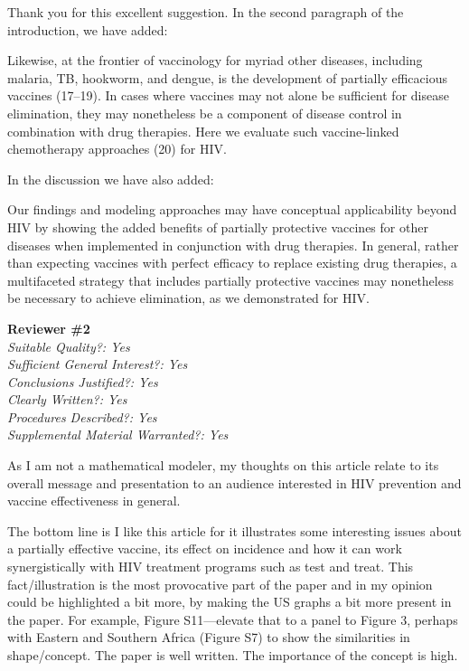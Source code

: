 \documentclass[12pt]{jpmletter}
\newcommand{\section}[1]{\textbf{#1}\\}
\newenvironment{original}{\it}{}
\begin{document}
\begin{letter}{}
    Thank you for this excellent suggestion. In the second paragraph
    of the introduction, we have added:
    \begin{quoting}
      Likewise, at the frontier of vaccinology for myriad other
      diseases, including malaria, TB, hookworm, and dengue, is the
      development of partially efficacious vaccines (17--19). In cases
      where vaccines may not alone be sufficient for disease
      elimination, they may nonetheless be a component of disease
      control in combination with drug therapies. Here we evaluate
      such vaccine-linked chemotherapy approaches (20) for HIV.
    \end{quoting}

    In the discussion we have also added:
    \begin{quoting}
      Our findings and modeling approaches may have conceptual
      applicability beyond HIV by showing the added benefits of
      partially protective vaccines for other diseases when
      implemented in conjunction with drug therapies. In general,
      rather than expecting vaccines with perfect efficacy to replace
      existing drug therapies, a multifaceted strategy that includes
      partially protective vaccines may nonetheless be necessary to
      achieve elimination, as we demonstrated for HIV.
    \end{quoting}

    \section{Reviewer \#2}
    \begin{original}
      Suitable Quality?: Yes \\
      Sufficient General Interest?: Yes \\
      Conclusions Justified?: Yes \\
      Clearly Written?: Yes \\
      Procedures Described?: Yes \\
      Supplemental Material Warranted?: Yes

      As I am not a mathematical modeler, my thoughts on this article
      relate to its overall message and presentation to an audience
      interested in HIV prevention and vaccine effectiveness in
      general.

      The bottom line is I like this article for it illustrates some
      interesting issues about a partially effective vaccine, its
      effect on incidence and how it can work synergistically with HIV
      treatment programs such as test and treat. This
      fact/illustration is the most provocative part of the paper and
      in my opinion could be highlighted a bit more, by making the US
      graphs a bit more present in the paper. For example, Figure
      S11—elevate that to a panel to Figure 3, perhaps with Eastern
      and Southern Africa (Figure S7) to show the similarities in
      shape/concept. The paper is well written. The importance of the
      concept is high.
    \end{original}


\end{letter}
\end{document}
